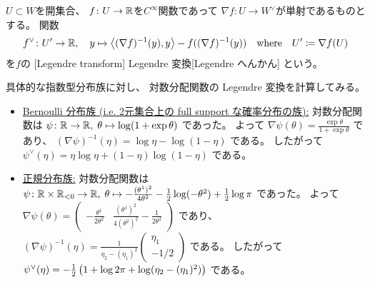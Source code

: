 \documentclass[report]{jlreq}
\begin{document}
\begin{definition}[Legendre 変換]
    $U \subset W$を開集合、
    $f \colon U \to \mathbb{R}$を$C^\infty$関数であって
    $\nabla f \colon U \to W^\vee$が単射であるものとする。
    関数
    \begin{equation}
        f^\vee \colon U' \to \mathbb{R},
            \quad
            y
            \mapsto
            \left\langle{(\nabla f)^{-1}(y)},{y}\right\rangle - f((\nabla f)^{-1}(y))
            \quad
            \text{where}
            \quad
            U' \coloneqq \nabla f(U)
    \end{equation}
    を$f$の
    [Legendre transform]
        {Legendre 変換}[Legendre へんかん]
    という。
\end{definition}

\begin{example}
    具体的な指数型分布族に対し、
    対数分配関数の Legendre 変換を計算してみる。
    \begin{itemize}
        \item \uline{Bernoulli 分布族 (i.e. 2元集合上の full support な確率分布の族):} \quad
            対数分配関数は
            $\psi \colon \mathbb{R} \to \mathbb{R}, \; \theta \mapsto \log (1 + \exp \theta)$
            であった。
            よって
            $\nabla \psi(\theta)
                =
                    \frac{\exp \theta}{1 + \exp \theta}$
            であり、
            $(\nabla \psi)^{-1}(\eta)
                =
                    \log \eta - \log (1 - \eta)$
            である。
            したがって
            $\psi^\vee(\eta)
                =
                    \eta \log \eta
                    + (1 - \eta) \log (1 - \eta)$
            である。
        \item \uline{正規分布族:} \quad
            対数分配関数は
            $\psi \colon \mathbb{R} \times \mathbb{R}_{< 0} \to \mathbb{R}, \;
                \theta
                \mapsto
                - \frac{(\theta^1)^2}{4 \theta^2}
                - \frac{1}{2} \log (- \theta^2)
                + \frac{1}{2} \log \pi$
            であった。
            よって
            $\nabla \psi(\theta)
                =
                    \begin{pmatrix}
                        - \frac{\theta^1}{2 \theta^2}
                        &
                        \frac{(\theta^1)^2}{4 (\theta^2)^2} - \frac{1}{2 \theta^2}
                    \end{pmatrix}$
            であり、
            $(\nabla \psi)^{-1}(\eta)
                =
                    \frac{1}{\eta_2 - (\eta_1)^2}
                    \begin{pmatrix}
                        \eta_1
                        \\
                        - 1/2
                    \end{pmatrix}$
            である。
            したがって
            $\psi^\vee(\eta)
                =
                    - \frac{1}{2}
                    \left({
                        1 + \log 2\pi
                        + \log(\eta_2 - (\eta_1)^2)
                    }\right)$
            である。
    \end{itemize}
\end{example}
\end{document}
